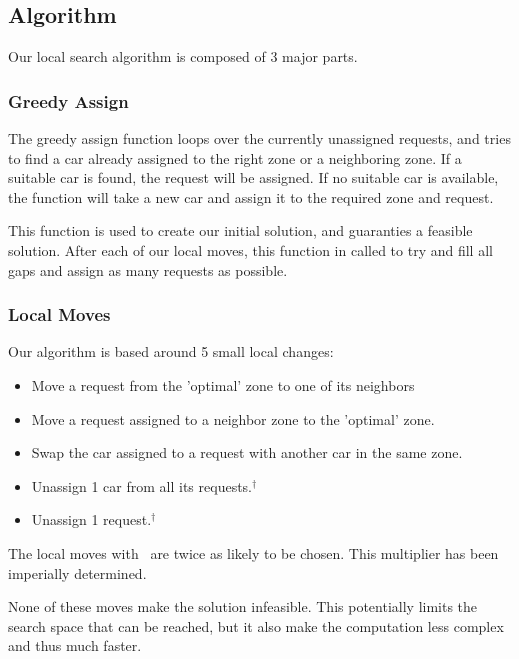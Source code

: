 \documentclass[11pt,a4paper]{article}
\begin{document}
    \subsection{Algorithm}\label{subsec:algorithm}

        Our local search algorithm is composed of 3 major parts.

        \subsubsection{Greedy Assign}
            The greedy assign function loops over the currently unassigned requests, and tries to find a car already assigned to the right zone or a neighboring zone.
            If a suitable car is found, the request will be assigned.
            If no suitable car is available, the function will take a new car and assign it to the required zone and request.

            This function is used to create our initial solution, and guaranties a feasible solution.
            After each of our local moves, this function in called to try and fill all gaps and assign as many requests as possible.

        \subsubsection{Local Moves}
            Our algorithm is based around 5 small local changes:
            \begin{itemize} \itemsep-0.25em
                \item Move a request from the 'optimal' zone to one of its neighbors
                \item Move a request assigned to a neighbor zone to the 'optimal' zone.
                \item Swap the car assigned to a request with another car in the same zone.
                \item Unassign 1 car from all its requests.$^\dagger$
                \item Unassign 1 request.$^\dagger$
            \end{itemize}
            The local moves with \textdagger~are twice as likely to be chosen.
            This multiplier has been imperially determined.

            None of these moves make the solution infeasible.
            This potentially limits the search space that can be reached, but it also make the computation less complex and thus much faster.
\end{document}
